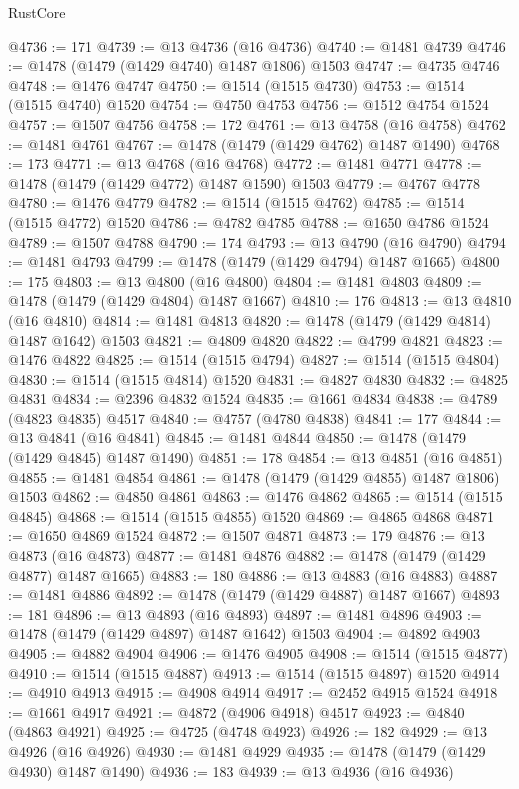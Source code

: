 \begin{lexlean}{RustCore}
\begin{coremodule}
@4736 := 171
@4739 := @13 @4736 (@16 @4736)
@4740 := @1481 @4739
@4746 := @1478 (@1479 (@1429 @4740) @1487 @1806) @1503
@4747 := @4735 @4746
@4748 := @1476 @4747
@4750 := @1514 (@1515 @4730)
@4753 := @1514 (@1515 @4740) @1520
@4754 := @4750 @4753
@4756 := @1512 @4754 @1524
@4757 := @1507 @4756
@4758 := 172
@4761 := @13 @4758 (@16 @4758)
@4762 := @1481 @4761
@4767 := @1478 (@1479 (@1429 @4762) @1487 @1490)
@4768 := 173
@4771 := @13 @4768 (@16 @4768)
@4772 := @1481 @4771
@4778 := @1478 (@1479 (@1429 @4772) @1487 @1590) @1503
@4779 := @4767 @4778
@4780 := @1476 @4779
@4782 := @1514 (@1515 @4762)
@4785 := @1514 (@1515 @4772) @1520
@4786 := @4782 @4785
@4788 := @1650 @4786 @1524
@4789 := @1507 @4788
@4790 := 174
@4793 := @13 @4790 (@16 @4790)
@4794 := @1481 @4793
@4799 := @1478 (@1479 (@1429 @4794) @1487 @1665)
@4800 := 175
@4803 := @13 @4800 (@16 @4800)
@4804 := @1481 @4803
@4809 := @1478 (@1479 (@1429 @4804) @1487 @1667)
@4810 := 176
@4813 := @13 @4810 (@16 @4810)
@4814 := @1481 @4813
@4820 := @1478 (@1479 (@1429 @4814) @1487 @1642) @1503
@4821 := @4809 @4820
@4822 := @4799 @4821
@4823 := @1476 @4822
@4825 := @1514 (@1515 @4794)
@4827 := @1514 (@1515 @4804)
@4830 := @1514 (@1515 @4814) @1520
@4831 := @4827 @4830
@4832 := @4825 @4831
@4834 := @2396 @4832 @1524
@4835 := @1661 @4834
@4838 := @4789 (@4823 @4835) @4517
@4840 := @4757 (@4780 @4838)
@4841 := 177
@4844 := @13 @4841 (@16 @4841)
@4845 := @1481 @4844
@4850 := @1478 (@1479 (@1429 @4845) @1487 @1490)
@4851 := 178
@4854 := @13 @4851 (@16 @4851)
@4855 := @1481 @4854
@4861 := @1478 (@1479 (@1429 @4855) @1487 @1806) @1503
@4862 := @4850 @4861
@4863 := @1476 @4862
@4865 := @1514 (@1515 @4845)
@4868 := @1514 (@1515 @4855) @1520
@4869 := @4865 @4868
@4871 := @1650 @4869 @1524
@4872 := @1507 @4871
@4873 := 179
@4876 := @13 @4873 (@16 @4873)
@4877 := @1481 @4876
@4882 := @1478 (@1479 (@1429 @4877) @1487 @1665)
@4883 := 180
@4886 := @13 @4883 (@16 @4883)
@4887 := @1481 @4886
@4892 := @1478 (@1479 (@1429 @4887) @1487 @1667)
@4893 := 181
@4896 := @13 @4893 (@16 @4893)
@4897 := @1481 @4896
@4903 := @1478 (@1479 (@1429 @4897) @1487 @1642) @1503
@4904 := @4892 @4903
@4905 := @4882 @4904
@4906 := @1476 @4905
@4908 := @1514 (@1515 @4877)
@4910 := @1514 (@1515 @4887)
@4913 := @1514 (@1515 @4897) @1520
@4914 := @4910 @4913
@4915 := @4908 @4914
@4917 := @2452 @4915 @1524
@4918 := @1661 @4917
@4921 := @4872 (@4906 @4918) @4517
@4923 := @4840 (@4863 @4921)
@4925 := @4725 (@4748 @4923)
@4926 := 182
@4929 := @13 @4926 (@16 @4926)
@4930 := @1481 @4929
@4935 := @1478 (@1479 (@1429 @4930) @1487 @1490)
@4936 := 183
@4939 := @13 @4936 (@16 @4936)

\end{coremodule}
\end{lexlean}
